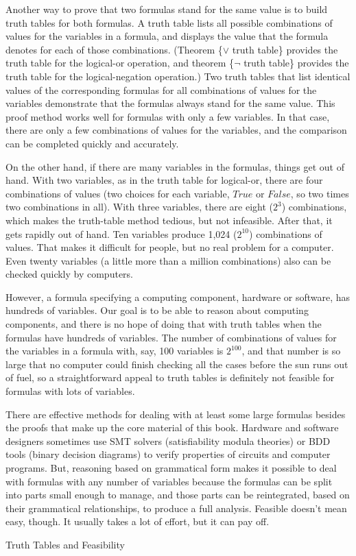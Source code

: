 \begin{aside}
Another way to prove that two formulas stand
for the same value is to build truth tables for both formulas.
A truth table lists all possible combinations of values for the
variables in a formula, and displays the value that the formula
denotes for each of those combinations. (Theorem \{$\vee$ truth table\} provides
the truth table for the logical-or operation, and theorem \{$\neg$ truth table\}
provides the truth table for the logical-negation operation.)
Two truth tables that list identical values of the corresponding
formulas for all combinations of values for
the variables demonstrate that the formulas always stand for the
same value. This proof method works well for formulas with only
a few variables. In that case, there are only a few combinations
of values for the variables, and the comparison can be completed quickly and accurately.

On the other hand, if there are many variables in the formulas,
things get out of hand. With two variables, as in the truth table
for logical-or, there are four combinations of values
(two choices for each variable, $True$ or $False$, so two times two
combinations in all). With three variables, there are eight
($2^3$) combinations, which makes the truth-table method tedious,
but not infeasible. After that, it gets rapidly out of hand.
Ten variables produce 1,024 ($2^{10}$) combinations of values.
That makes it difficult for people, but no real problem for a computer.
Even twenty variables (a little more than a million combinations)
also can be checked quickly by computers.

However, a formula specifying a computing component,
hardware or software, has hundreds of variables.
Our goal is to be able to reason about
computing components, and there is no hope of doing that
with truth tables when the formulas have hundreds of variables.
The number of combinations
of values for the variables in a formula with, say,
100 variables is $2^{100}$, and that number is so large that no computer could
finish checking all the cases before the sun runs out of fuel,
so a straightforward appeal to truth tables is
definitely not feasible for formulas with lots of variables.

There are effective methods
for dealing with at least some large formulas
besides the proofs that make up the core
material of this book.
Hardware and software designers sometimes use
SMT solvers (satisfiability modula theories) or
BDD tools (binary decision diagrams)
to verify properties of circuits and computer programs.
But, reasoning based on grammatical form
makes it possible to deal with formulas with any number of variables
because the formulas can be split into parts small enough
to manage, and those parts can be reintegrated, based on
their grammatical relationships, to produce a full analysis.
Feasible doesn't mean easy, though.
It usually takes a lot of effort,
but it can pay off.
\caption{Truth Tables and Feasibility}
\label{feasibility}
\end{aside}

